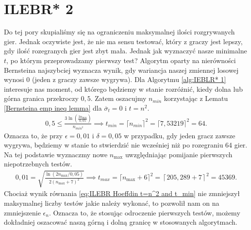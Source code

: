 \documentclass[inzynierska]{pwr_wmat_praca_dyplomowa}
\theoremstyle{plain}
\numberwithin{theorem}{chapter}
\theoremstyle{definition}
\numberwithin{theorem}{chapter}
\newcommand{\nmax}{n_{\text{max}}}
\begin{document}
	\section{ILEBR* 2}
	Do tej pory skupialiśmy się na ograniczeniu maksymalnej ilości rozgrywanych gier. Jednak oczywiste jest, że nie ma sensu testować, który z graczy jest lepszy, gdy ilość rozegranych gier jest zbyt mała. Jednak jak wyznaczyć nasze minimalne $t$, po którym przeprowadzamy pierwszy test? Algorytm oparty na nierówności Bernsteina najszybciej wyznacza wynik, gdy wariancja naszej zmiennej losowej wynosi 0 (jeden z graczy zawsze wygrywa). Dla Algorytmu \ref{alg:IEBLR* 1} interesuje nas moment, od którego będziemy w stanie rozróżnić, kiedy dolna lub górna granica przekroczy $0,5$. Zatem oszacujmy $n_{min}$ korzystając z Lematu \ref{Bernsteina emp ineq lemma} dla $\overline{\sigma}_t=0$ i $t = n^2$.
	\begin{gather*}
		\label{eq:ILEBR Bernstein t=n^2}
		0,5 \le \frac{3  \ln(\frac{3\nmax}{0,05})}{n_{min^2}}\implies t_{min} = \lceil n_{min} \rceil^2 = \lceil7,53219\rceil^2= 64. 
	\end{gather*}
	Oznacza to, że przy $\epsilon = 0,01$ i $\delta = 0,05$ w przypadku, gdy jeden gracz zawsze wygrywa, będziemy w stanie to stwierdzić nie wcześniej niż po rozegraniu 64 gier.
	Na tej podstawie wyznaczmy nowe $\nmax$ uwzględniając pomijanie pierwszych niepotrzebnych testów.
	\begin{gather}
		\label{eq:ILEBR Hoeffdin t=n^2 and t_min}
		0,01 =  \sqrt{\frac{\ln(2\nmax/0,05)}{2(\nmax+7)^2}} \implies t_{max} = \lceil \nmax+6\rceil^2 = \left\lceil 205,289+7\right\rceil^2= 45369.
	\end{gather}
	Chociaż wynik równania \eqref{eq:ILEBR Hoeffdin t=n^2 and t_min} nie zmniejszył maksymalnej liczby testów jakie należy wykonać, to pozwolił nam on na zmniejszenie $\epsilon_n$. Oznacza to, że stosując odroczenie pierwszych testów, możemy dokładniej oszacować naszą górną i dolną granicę w stosowanych algorytmach.
\end{document}
